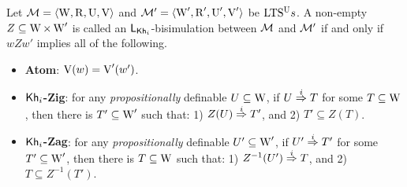 \begin{definition}\label{def:bisim-khi}
Let $\mathcal{M} = \langle \operatorname{W},\operatorname{R},\operatorname{U},\operatorname{V} \rangle$ and $\mathcal{M}' = \langle \operatorname{W}',\operatorname{R}',\operatorname{U}',\operatorname{V}' \rangle$ be ${\textup{LTS$^\text{\textup{U}}$}}s$.
%
A non-empty $Z \subseteq \operatorname{W} \times \operatorname{W}'$ is called an $\mathsf{L}_{{\sf Kh}_i}$-bisimulation between $\mathcal{M}$ and $\mathcal{M}'$ if and only if $wZw'$ implies all of the following.
\begin{itemize} 
    \item \textbf{Atom}: $\operatorname{V}(w)=\operatorname{V}'(w')$.

    \item \textbf{${\sf Kh}_i$-Zig}: for any \emph{propositionally} definable $U \subseteq \operatorname{W}$, if $U \stackrel{i}{\Rightarrow} T$ for some $T \subseteq \operatorname{W}$, then there is $T' \subseteq \operatorname{W}'$ such that: 
        1) $Z(U) \stackrel{i}{\Rightarrow} T'$, and
        2) $T' \subseteq Z(T)$.

    \item \textbf{${\sf Kh}_i$-Zag}: %
    for any \emph{propositionally} definable $U' \subseteq \operatorname{W}'$, if $U' \stackrel{i}{\Rightarrow} T'$ for some $T' \subseteq \operatorname{W}'$, then there is $T \subseteq \operatorname{W}$ such that: 
        1) $Z^{-1}(U') \stackrel{i}{\Rightarrow} T$, and
        2) $T \subseteq Z^{-1}(T')$.


\end{itemize}
\end{definition}
